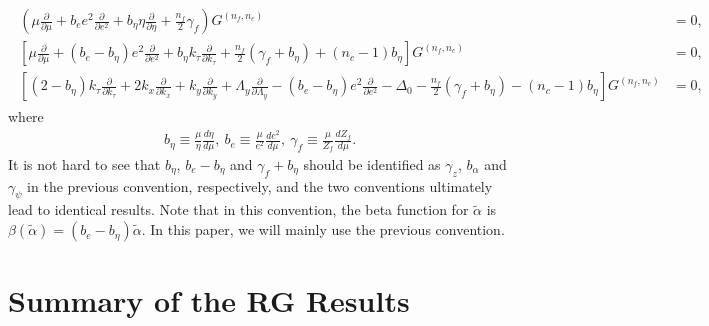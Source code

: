 \documentclass[prx,amsmath,amssymb, notitlepage, onecolumn,
nofootinbib,
superscriptaddress,
longbibliography
]{revtex4-1}
\newcommand{\beq}{\begin{eqnarray}}
\newcommand{\eeq}{\end{eqnarray}}
\begin{document}
\beq
\begin{split}
	\left(\mu\frac{\partial}{\partial\mu}+b_e e^2\frac{\partial}{\partial e^2}+b_\eta\eta\frac{\partial}{\partial\eta}+\frac{n_f}{2}\gamma_f\right)G^{(n_f, n_c)}&=0,\\
	\left[\mu\frac{\partial}{\partial\mu}+(b_e-b_\eta)e^2\frac{\partial}{\partial e^2}+b_\eta k_\tau\frac{\partial}{\partial k_\tau}+\frac{n_f}{2}(\gamma_f+b_\eta)+(n_c-1)b_\eta\right]G^{(n_f, n_c)}&=0,\\
	\left[(2-b_\eta)k_\tau\frac{\partial}{\partial k_\tau}+2k_x\frac{\partial}{\partial k_x}+k_y\frac{\partial}{\partial k_y}+\Lambda_y\frac{\partial}{\partial\Lambda_y}-(b_e-b_\eta)e^2\frac{\partial}{\partial e^2}-\Delta_0-\frac{n_f}{2}(\gamma_f+b_\eta)-(n_c-1)b_\eta\right]G^{(n_f, n_c)}&=0,
\end{split}
\eeq
where
\beq
b_\eta\equiv\frac{\mu}{\eta}\frac{d\eta}{d\mu},~b_e\equiv\frac{\mu}{e^2}\frac{d e^2}{d\mu},~\gamma_f\equiv\frac{\mu}{Z_f}\frac{dZ_f}{d\mu}.
\eeq
It is not hard to see that $b_\eta$, $b_e-b_\eta$ and $\gamma_f+b_\eta$ should be identified as $\gamma_z$, $b_\alpha$ and $\gamma_\psi$ in the previous convention, respectively, and the two conventions ultimately lead to identical results. Note that in this convention, the beta function for $\tilde\alpha$ is $\beta(\tilde\alpha)=\left(b_e-b_\eta\right)\tilde\alpha$. In this paper, we will mainly use the previous convention.



\section{Summary of the RG Results}\label{app: summary}
\end{document}
